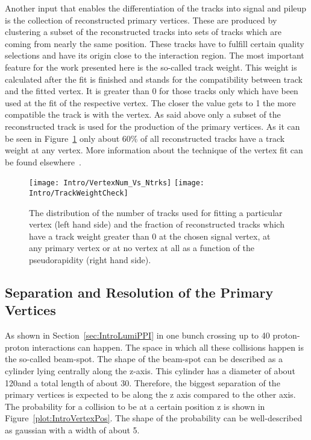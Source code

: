 Another input that enables the differentiation of the tracks into signal and pileup is the collection of reconstructed primary vertices. These are produced by clustering a subset of the reconstructed tracks into sets of tracks which are coming from nearly the same position. These tracks have to fulfill certain quality selections and have its origin close to the interaction region. The most important feature for the work presented here is the so-called track weight. This weight is calculated after the fit is finished and stands for the compatibility between track and the fitted vertex. It is greater than 0 for those tracks only which have been used at the fit of the respective vertex. The closer the value gets to 1 the more compatible the track is with the vertex. As said above only a subset of the reconstructed track is used for the production of the primary vertices. As it can be seen in Figure~\ref{plot:IntroTrackWeight} only about $60\%$ of all reconstructed tracks have a track weight at any vertex.  More information about the technique of the vertex fit can be found elsewhere~\cite{CMS-PAPER-TRK-11-001}.

\begin{figure}[!Hhtb]
  \centering
  \texttt{[image: Intro/VertexNum\_Vs\_Ntrks]}
  \texttt{[image: Intro/TrackWeightCheck]}
  \caption[Distribution of number of tracks used for fitting the vertices and fraction of reconstructed tracks which have a track weight at any primary vertex]{The distribution of the number of tracks used for fitting a particular vertex (left hand side) and the fraction of reconstructed tracks which have a track weight greater than 0 at the chosen signal vertex, at any primary vertex or at no vertex at all as a function of the pseudorapidity (right hand side). \label{plot:IntroTrackWeight}}
\end{figure}

\subsection{Separation and Resolution of the Primary Vertices\label{sec:IntroSepResPV}}

As shown in Section~\ref{sec:IntroLumiPPI} in one bunch crossing up to 40 proton-proton interactions can happen. The space in which all these collisions happen is the so-called beam-spot. The shape of the beam-spot can be described as a cylinder lying centrally along the z-axis. This cylinder has a diameter of about 120\mum and a total length of about 30\cm. Therefore, the biggest separation of the primary vertices is expected to be along the z axis compared to the other axis. The probability for a collision to be at a certain position z is shown in Figure~\ref{plot:IntroVertexPos}. The shape of the probability can be well-described as gaussian with a width of about 5\cm. 

